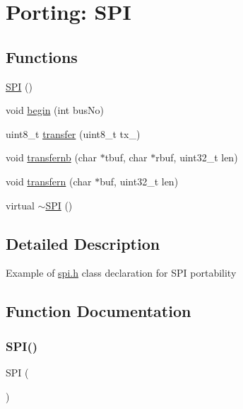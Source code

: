 \hypertarget{group__Porting__SPI}{}\section{Porting\+: S\+PI}
\label{group__Porting__SPI}
\subsection*{Functions}
\begin{DoxyCompactItemize}
\item 
\hyperlink{group__Porting__SPI_gacd293e741d829f9578b8c5ee49833608}{S\+PI} ()
\item 
void \hyperlink{group__Porting__SPI_gaf79095574842d60a6297aa5b01b6185f}{begin} (int bus\+No)
\item 
uint8\+\_\+t \hyperlink{group__Porting__SPI_gad8a210abb2138c105350cc91972edfa9}{transfer} (uint8\+\_\+t tx\+\_\+)
\item 
void \hyperlink{group__Porting__SPI_ga26b5af7f6420d54b479af9eaf1b2e452}{transfernb} (char $\ast$tbuf, char $\ast$rbuf, uint32\+\_\+t len)
\item 
void \hyperlink{group__Porting__SPI_gade902816b77c7377afd02ea4cb7e30b5}{transfern} (char $\ast$buf, uint32\+\_\+t len)
\item 
virtual \hyperlink{group__Porting__SPI_ga224a368f34373695f2a7e631d0742029}{$\sim$\+S\+PI} ()
\end{DoxyCompactItemize}


\subsection{Detailed Description}
Example of \hyperlink{spi_8h}{spi.\+h} class declaration for S\+PI portability 

\subsection{Function Documentation}
\mbox{\label{group__Porting__SPI_gacd293e741d829f9578b8c5ee49833608}} 
\subsubsection{\texorpdfstring{S\+P\+I()}{SPI()}}
{\footnotesize\ttfamily S\+PI (\begin{DoxyParamCaption}{ }\end{DoxyParamCaption})}

